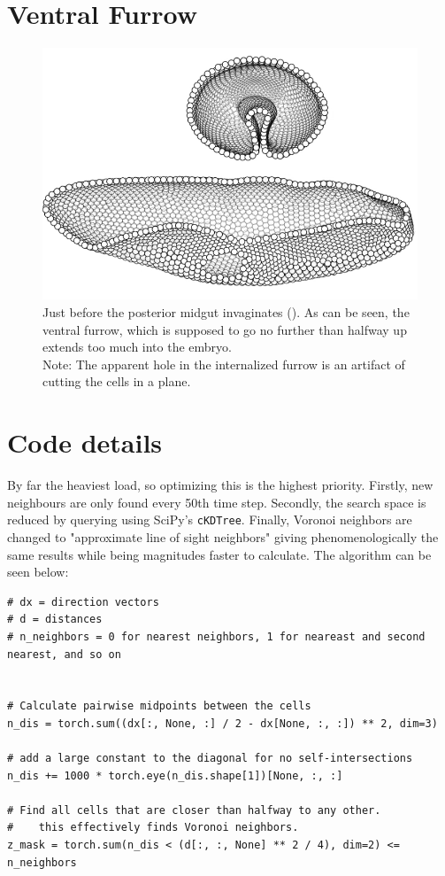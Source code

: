 \section{Ventral Furrow}
\label{App:VF}
\begin{figure}[H]
    \centering
    \includegraphics[width=0.9\linewidth]{chapters/Appendix/cross_sections.png}
    \caption{Just before the posterior midgut invaginates (). As can be seen, the ventral furrow, which is supposed to go no further than halfway up extends too much into the embryo. \\Note: The apparent hole in the internalized furrow is an artifact of cutting the cells in a plane.}
    \label{fig:enter-label}
\end{figure}
\section{Code details}
\label{App:Code}
By far the heaviest load, so optimizing this is the highest priority. Firstly, new neighbours are only found every 50th time step. 
Secondly, the search space is reduced by querying using SciPy's \verb|cKDTree|.
Finally, Voronoi neighbors are changed to "approximate line of sight neighbors" giving phenomenologically the same results while being magnitudes faster to calculate. The algorithm can be seen below:

\begin{lstlisting}
# dx = direction vectors
# d = distances
# n_neighbors = 0 for nearest neighbors, 1 for neareast and second nearest, and so on 


# Calculate pairwise midpoints between the cells
n_dis = torch.sum((dx[:, None, :] / 2 - dx[None, :, :]) ** 2, dim=3)

# add a large constant to the diagonal for no self-intersections 
n_dis += 1000 * torch.eye(n_dis.shape[1])[None, :, :]

# Find all cells that are closer than halfway to any other.
#    this effectively finds Voronoi neighbors.
z_mask = torch.sum(n_dis < (d[:, :, None] ** 2 / 4), dim=2) <= n_neighbors
\end{lstlisting}

